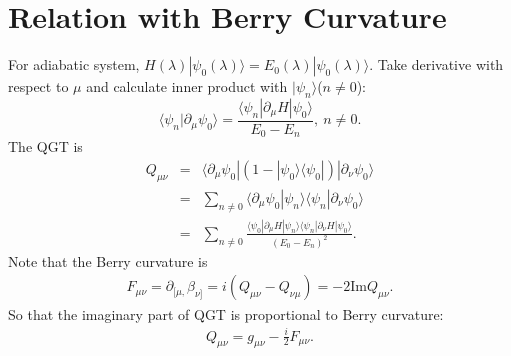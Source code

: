 \documentclass[aps,prb,superscriptaddress]{revtex4}
\begin{document}
\section{Relation with Berry Curvature}
For adiabatic system, $H(\lambda)|\psi_0(\lambda)\rangle = E_0(\lambda)|\psi_0(\lambda)\rangle$. Take derivative with respect to $\mu$ and calculate inner product with $|\psi_n\rangle$($n \ne 0$):
\begin{equation}
	\langle \psi_n |\partial_\mu \psi_0 \rangle = \frac{\langle \psi_n |\partial_\mu H| \psi_0 \rangle}{E_0 - E_n},\ n \ne 0.
\end{equation}
The QGT is
\begin{eqnarray}
	Q_{\mu\nu} &=& \langle \partial_\mu \psi_0 |(1-|\psi_0 \rangle \langle \psi_0|)| \partial_\nu \psi_0 \rangle \nonumber \\
	&=& \sum_{n \ne 0} \langle \partial_\mu \psi_0|\psi_n\rangle \langle\psi_n|\partial_\nu \psi_0 \rangle \nonumber \\
	&=& \sum_{n \ne 0} \frac{\langle \psi_0|\partial_\mu H|\psi_n\rangle \langle\psi_n|\partial_\nu H|\psi_0 \rangle}{(E_0 - E_n)^2}.
\end{eqnarray}
Note that the Berry curvature is
\begin{eqnarray}
	F_{\mu\nu} = \partial_{[\mu,}\beta_{\nu]} = i(Q_{\mu\nu} - Q_{\nu\mu})
	= -2\mathrm{Im}Q_{\mu\nu}.
\end{eqnarray}
So that the imaginary part of QGT is proportional to Berry curvature:
\begin{eqnarray}
	Q_{\mu\nu} = g_{\mu\nu}-\frac{i}{2}F_{\mu\nu}.
\end{eqnarray}

\end{document}
